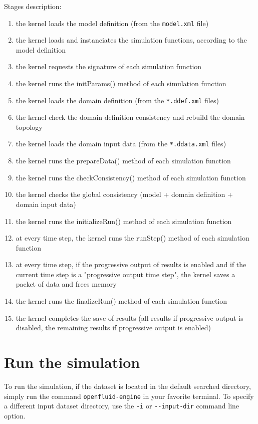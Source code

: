 Stages description:
\begin{enumerate}
  \item the kernel loads the model definition (from the \texttt{model.xml} file)  
  \item the kernel loads and instanciates the simulation functions, according to the model definition
  \item the kernel requests the signature of each simulation function 
  \item the kernel runs the initParams() method of each simulation function
  \item the kernel loads the domain definition (from the \texttt{*.ddef.xml} files)
  \item the kernel check the domain definition consistency and rebuild the domain topology
  \item the kernel loads the domain input data (from the \texttt{*.ddata.xml} files)
  \item the kernel runs the prepareData() method of each simulation function
  \item the kernel runs the checkConsistency() method of each simulation function
  \item the kernel checks the global consistency (model + domain definition + domain input data)
  \item the kernel runs the initializeRun() method of each simulation function
  \item at every time step, the kernel runs the runStep() method of each simulation function
  \item at every time step, if the progressive output of results is enabled and if the current time step is a "progressive output time step", the kernel saves a packet of data and frees memory  
  \item the kernel runs the finalizeRun() method of each simulation function
  \item the kernel completes the save of results (all results if progressive output is disabled, the remaining results if progressive output is enabled) 
\end{enumerate}


\bigskip


\section{Run the simulation}

To run the simulation, if the dataset is located in the default searched directory, simply run the command \texttt{openfluid-engine} in your favorite terminal. 
To specify a different input dataset directory, use the \texttt{-i} or \verb?--?\texttt{input-dir} command line option.    

